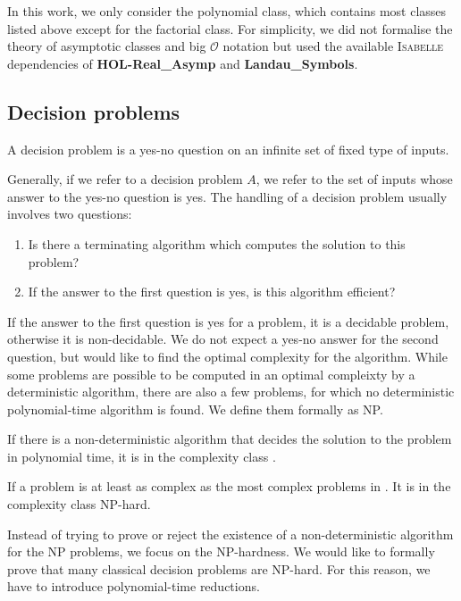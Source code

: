 In this work, we only consider the polynomial class, which contains most classes listed above 
except for the factorial class. For simplicity, we did not 
formalise the theory of asymptotic classes and big $\mathcal{O}$ notation but used the 
available \textsc{Isabelle} dependencies of \textbf{HOL-Real\_Asymp} and \textbf{Landau\_Symbols}.

\subsection{Decision problems}
\begin{definition}
    A decision problem is a yes-no question on an infinite set of fixed type of inputs.
\end{definition}
Generally, if we refer to a decision problem $A$, we refer to the set of inputs whose answer to the yes-no question is yes. 
The handling of a decision problem usually involves two questions:
\begin{enumerate}
    \item Is there a terminating algorithm which computes the solution to this problem?
    \item If the answer to the first question is yes, is this algorithm efficient?
\end{enumerate}
If the answer to the first question is yes for a problem, it is a decidable problem, otherwise it is non-decidable. 
We do not expect a yes-no answer for the second question, but would like to find 
the optimal complexity for the algorithm. While some problems are possible to be computed in 
an optimal compleixty by a deterministic algorithm, there are also a few problems, for which 
no deterministic polynomial-time algorithm is found. We define them formally as NP.
\begin{definition}
    If there is a non-deterministic algorithm 
    that decides the solution to the problem in polynomial time, it is in the complexity 
    class \NP. 
\end{definition}
\begin{definition}
If a problem is at least as complex as the most complex problems in \NP. It is 
    in the complexity class NP-hard.
\end{definition}

Instead of trying to prove or reject the existence of a non-deterministic algorithm 
for the NP problems, we focus on the NP-hardness. We would like to formally prove 
that many classical decision problems are NP-hard. For this reason, we have to introduce polynomial-time reductions.

